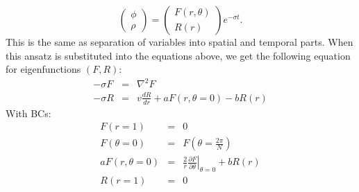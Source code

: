 \documentclass{article}
\begin{document}
\begin{equation}
\left(\begin{array}{c} \phi \\ \rho \end{array}\right) = \left(\begin{array}{c} F(r,\theta) \\ R(r) \end{array}\right) e^{-\sigma t}.
\end{equation}
This is the same as separation of variables into spatial and temporal parts.  When this ansatz is substituted into the equations above, we get the following equation for eigenfunctions $(F,R)$:
\begin{eqnarray}
\label{eq:one_new} -\sigma F &=& \nabla^2 F \\
\label{eq:two_new} -\sigma R &=& v \frac{d R}{d r} + aF(r,\theta=0) - b R(r)
\end{eqnarray}
With BCs:
\begin{eqnarray}
\label{eq:BC1} F(r=1) &=& 0  \\
\label{eq:BC2} F(\theta=0) &=& F(\theta = \frac{2\pi}{N})  \\
\label{eq:BC3} a F(r,\theta=0) &=& \frac{2}{r} \left. \frac{\partial F}{\partial \theta} \right|_{\theta=0}  + b R(r) \\
\label{eq:BC4} R(r=1) &=& 0
\end{eqnarray}
\end{document}
